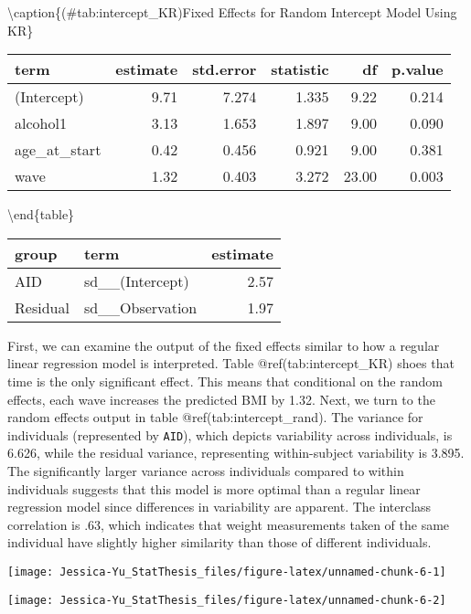 \documentclass[12pt, twoside]{amherstthesis}
\begin{document}
\textbackslash caption\{(\#tab:intercept\_KR)Fixed Effects for Random Intercept Model Using KR\}
\centering
\begin{tabular}[t]{l|r|r|r|r|r}
\hline
term & estimate & std.error & statistic & df & p.value\\
\hline
(Intercept) & 9.71 & 7.274 & 1.335 & 9.22 & 0.214\\
\hline
alcohol1 & 3.13 & 1.653 & 1.897 & 9.00 & 0.090\\
\hline
age\_at\_start & 0.42 & 0.456 & 0.921 & 9.00 & 0.381\\
\hline
wave & 1.32 & 0.403 & 3.272 & 23.00 & 0.003\\
\hline
\end{tabular}
\textbackslash end\{table\}
\begin{table}
\centering
\begin{tabular}[t]{l|l|r}
\hline
group & term & estimate\\
\hline
AID & sd\_\_(Intercept) & 2.57\\
\hline
Residual & sd\_\_Observation & 1.97\\
\hline
\end{tabular}
\end{table}
First, we can examine the output of the fixed effects similar to how a regular linear regression model is interpreted. Table @ref(tab:intercept\_KR) shoes that time is the only significant effect. This means that conditional on the random effects, each wave increases the predicted BMI by 1.32. Next, we turn to the random effects output in table @ref(tab:intercept\_rand). The variance for individuals (represented by \texttt{AID}), which depicts variability across individuals, is 6.626, while the residual variance, representing within-subject variability is 3.895. The significantly larger variance across individuals compared to within individuals suggests that this model is more optimal than a regular linear regression model since differences in variability are apparent. The interclass correlation is .63, which indicates that weight measurements taken of the same individual have slightly higher similarity than those of different individuals.
\begin{center}\texttt{[image: Jessica-Yu\_StatThesis\_files/figure-latex/unnamed-chunk-6-1]} \end{center}
\begin{center}\texttt{[image: Jessica-Yu\_StatThesis\_files/figure-latex/unnamed-chunk-6-2]} \end{center}
\end{document}
